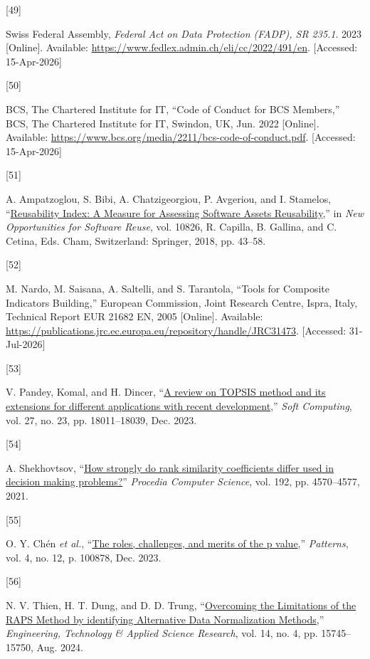 \documentclass[
  journal,
]{IEEEtran}%
\newlength{\cslhangindent}
\newlength{\csllabelwidth}
\newenvironment{CSLReferences}[2] %
 {\begin{list}{}{%
  \setlength{\itemindent}{0pt}
  \setlength{\leftmargin}{0pt}
  \setlength{\parsep}{0pt}
  \ifodd #1
   \setlength{\leftmargin}{\cslhangindent}
   \setlength{\itemindent}{-1\cslhangindent}
  \fi
  \setlength{\itemsep}{#2\baselineskip}}}
 {\end{list}}
\newcommand{\CSLLeftMargin}[1]{\parbox[t]{\csllabelwidth}{\strut#1\strut}}
\newcommand{\CSLRightInline}[1]{\parbox[t]{\linewidth - \csllabelwidth}{\strut#1\strut}}
\begin{document}
\begin{CSLReferences}{0}{0}
\CSLLeftMargin{{[}49{]} }%
\CSLRightInline{Swiss Federal Assembly, \emph{Federal {Act} on {Data
Protection} ({FADP}), {SR} 235.1}. 2023 {[}Online{]}. Available:
\url{https://www.fedlex.admin.ch/eli/cc/2022/491/en}. {[}Accessed:
15-Apr-2026{]}}

\CSLLeftMargin{{[}50{]} }%
\CSLRightInline{BCS, The Chartered Institute for IT, {``Code of
{Conduct} for {BCS Members},''} BCS, The Chartered Institute for IT,
Swindon, UK, Jun. 2022 {[}Online{]}. Available:
\url{https://www.bcs.org/media/2211/bcs-code-of-conduct.pdf}.
{[}Accessed: 15-Apr-2026{]}}

\CSLLeftMargin{{[}51{]} }%
\CSLRightInline{A. Ampatzoglou, S. Bibi, A. Chatzigeorgiou, P. Avgeriou,
and I. Stamelos,
{``\href{https://doi.org/10.1007/978-3-319-90421-4_3}{Reusability
{Index}: {A Measure} for {Assessing Software Assets Reusability}},''} in
\emph{New {Opportunities} for {Software Reuse}}, vol. 10826, R. Capilla,
B. Gallina, and C. Cetina, Eds. Cham, Switzerland: Springer, 2018, pp.
43--58. }

\CSLLeftMargin{{[}52{]} }%
\CSLRightInline{M. Nardo, M. Saisana, A. Saltelli, and S. Tarantola,
{``Tools for {Composite Indicators Building},''} European Commission,
Joint Research Centre, Ispra, Italy, Technical Report EUR 21682 EN, 2005
{[}Online{]}. Available:
\url{https://publications.jrc.ec.europa.eu/repository/handle/JRC31473}.
{[}Accessed: 31-Jul-2026{]}}

\CSLLeftMargin{{[}53{]} }%
\CSLRightInline{V. Pandey, Komal, and H. Dincer,
{``\href{https://doi.org/10.1007/s00500-023-09011-0}{A review on
{TOPSIS} method and its extensions for different applications with
recent development},''} \emph{Soft Computing}, vol. 27, no. 23, pp.
18011--18039, Dec. 2023. }

\CSLLeftMargin{{[}54{]} }%
\CSLRightInline{A. Shekhovtsov,
{``\href{https://doi.org/10.1016/j.procs.2021.09.235}{How strongly do
rank similarity coefficients differ used in decision making
problems?}''} \emph{Procedia Computer Science}, vol. 192, pp.
4570--4577, 2021. }

\CSLLeftMargin{{[}55{]} }%
\CSLRightInline{O. Y. Chén \emph{et al.},
{``\href{https://doi.org/10.1016/j.patter.2023.100878}{The roles,
challenges, and merits of the p value},''} \emph{Patterns}, vol. 4, no.
12, p. 100878, Dec. 2023. }

\CSLLeftMargin{{[}56{]} }%
\CSLRightInline{N. V. Thien, H. T. Dung, and D. D. Trung,
{``\href{https://doi.org/10.48084/etasr.7909}{Overcoming the
{Limitations} of the {RAPS Method} by identifying {Alternative Data
Normalization Methods}},''} \emph{Engineering, Technology \& Applied
Science Research}, vol. 14, no. 4, pp. 15745--15750, Aug. 2024. }

\end{CSLReferences}
\end{document}

